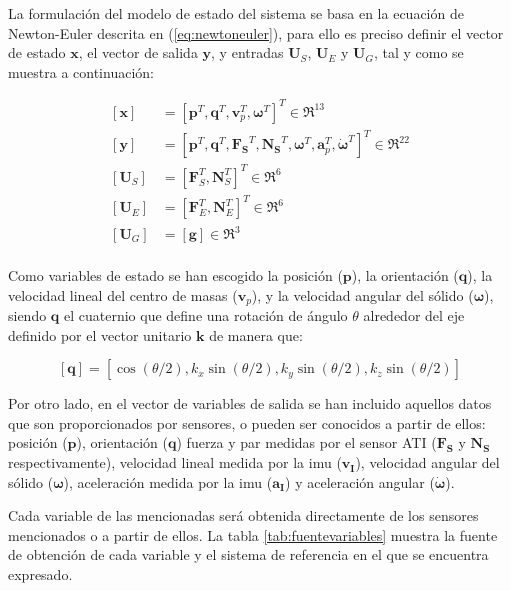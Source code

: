 La formulación del modelo de estado del sistema se basa en la ecuación de Newton-Euler descrita en (\ref{eq:newtoneuler}), para ello es preciso definir el vector de estado $\boldsymbol{x}$, el vector de salida $\boldsymbol{y}$, y entradas $\boldsymbol{U}_S$, $\boldsymbol{U}_E$ y $\boldsymbol{U}_G$, tal y como se muestra a continuación:

\begin{equation}
\begin{split}
	[\boldsymbol{x}] &= [\boldsymbol{p}^T,\boldsymbol{q}^T,\boldsymbol{v}_p^T,\boldsymbol{\omega}^T]^T \in \Re^{13} \\
	[\boldsymbol{y}] &= [\boldsymbol{p}^T,\boldsymbol{q}^T,\boldsymbol{F_S}^T,\boldsymbol{N_S}^T,\boldsymbol{\omega}^T,\boldsymbol{a}_p^T,\dot{\boldsymbol{\omega}}^T]^T \in \Re^{22} \\
	[\boldsymbol{U}_S] &= [\boldsymbol{F}_S^T, \boldsymbol{N}_S^T]^T \in \Re^{6} \\
	[\boldsymbol{U}_E] &= [\boldsymbol{F}_E^T, \boldsymbol{N}_E^T]^T \in \Re^{6} \\
	[\boldsymbol{U}_G] &= [\boldsymbol{g}] \in \Re^{3} \\
\label{eq:vectores}
\end{split}
\end{equation}

Como variables de estado se han escogido la posición ($\boldsymbol{p}$), la orientación ($\boldsymbol{q}$), la velocidad lineal del centro de masas ($\boldsymbol{v}_p$), y la velocidad angular del sólido ($\boldsymbol{\omega}$), siendo $\boldsymbol{q}$ el cuaternio que define una rotación de ángulo $\theta$ alrededor del eje definido por el vector unitario $\boldsymbol{k}$ de manera que:

	\[ [\boldsymbol{q}] = [\cos(\theta/2),k_x\sin(\theta/2),k_y\sin(\theta/2),k_z\sin(\theta/2)] \]

Por otro lado, en el vector de variables de salida se han incluido aquellos datos que son proporcionados por sensores, o pueden ser conocidos a partir de ellos: posición ($\boldsymbol{p}$), orientación ($\boldsymbol{q}$) fuerza y par medidas por el sensor ATI ($\boldsymbol{F_S}$ y $\boldsymbol{N_S}$ respectivamente), velocidad lineal medida por la \acrshort{imu} ($\boldsymbol{v_I}$), velocidad angular del sólido ($\boldsymbol{\omega}$), aceleración medida por la \acrshort{imu} ($\boldsymbol{a_I}$) y aceleración angular ($\boldsymbol{\dot{\omega}}$). \par

Cada variable de las mencionadas será obtenida directamente de los sensores mencionados o a partir de ellos. La tabla \ref{tab:fuentevariables} muestra la fuente de obtención de cada variable y el sistema de referencia en el que se encuentra expresado. \par

